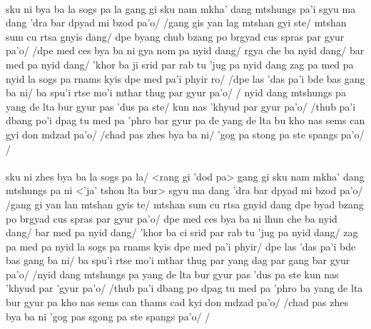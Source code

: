 \documentclass[12pt]{article}
\begin{document}
\textbf{\TVA}\\
sku ni bya ba la sogs pa la gang gi sku nam mkha' dang mtshungs pa'i sgyu ma dang 'dra bar dpyad mi bzod pa'o/ /gang gis yan lag mtshan gyi ste/ mtshan sum cu rtsa gnyis dang/ dpe byang chub bzang po brgyad cus spras par gyur pa'o/ /dpe med ces bya ba ni gya nom pa nyid dang/ rgya che ba nyid dang/ bar med pa nyid dang/ 'khor ba ji srid par rab tu 'jug pa nyid dang zag pa med pa nyid la sogs pa rnams kyis dpe med pa'i phyir ro/ /dpe las 'das pa'i bde bas gang ba ni/ ba spu'i rtse mo'i mthar thug par gyur pa'o/ / nyid dang mtshungs pa yang de lta bur gyur pas 'dus pa ste/ kun nas 'khyud par gyur pa'o/ /thub pa'i dbang po'i dpag tu med pa 'phro bar gyur pa de yang de lta bu kho nas sems can gyi don mdzad pa'o/ /chad pas zhes bya ba ni/ 'gog pa stong pa ste spangs pa'o/ /\\

\textbf{\TVB}\\
sku ni zhes bya ba la sogs pa la/ <rang gi 'dod pa> gang gi sku nam mkha' dang mtshungs pa ni <'ja' tshon lta bur> sgyu ma dang 'dra bar dpyad mi bzod pa'o/ /gang gi yan lan mtshan gyis te/ mtshan sum cu rtsa gnyid dang dpe byad bzang po brgyad cus spras par gyur pa'o/ dpe med ces bya ba ni lhun che ba nyid dang/ bar med pa nyid dang/ 'khor ba ci srid par rab tu 'jug pa nyid dang/ zag pa med pa nyid la sogs pa rnams kyis dpe med pa'i phyir/ dpe las 'das pa'i bde bas gang ba ni/ ba spu'i rtse mo'i mthar thug par yang dag par gang bar gyur pa'o/ /nyid dang mtshungs pa yang de lta bur gyur pas 'dus pa ste kun nas 'khyud par 'gyur pa'o/ /thub pa'i dbang po dpag tu med pa 'phro ba yang de lta bur gyur pa kho nas sems can thams cad kyi don mdzad pa'o/ /chad pas zhes bya ba ni 'gog pas sgong pa ste spangs pa'o/ /\\
\end{document}
